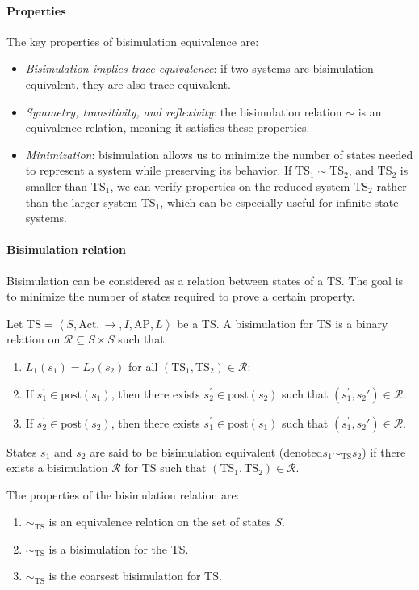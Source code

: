\paragraph*{Properties}
The key properties of bisimulation equivalence are: 
\begin{itemize}
    \item \textit{Bisimulation implies trace equivalence}: if two systems are bisimulation equivalent, they are also trace equivalent.
    \item \textit{Symmetry, transitivity, and reflexivity}: the bisimulation relation $\sim$ is an equivalence relation, meaning it satisfies these properties.
    \item \textit{Minimization}: bisimulation allows us to minimize the number of states needed to represent a system while preserving its behavior. 
        If $\text{TS}_1\sim\text{TS}_2$, and $\text{TS}_2$ is smaller than $\text{TS}_1$, we can verify properties on the reduced system $\text{TS}_2$ rather than the larger system $\text{TS}_1$, which can be especially useful for infinite-state systems.
\end{itemize}

\paragraph*{Bisimulation relation}
Bisimulation can be considered as a relation between states of a TS. 
The goal is to minimize the number of states required to prove a certain property.
\begin{definition}
    Let $\text{TS}=\left\langle S,\text{Act},\rightarrow,I,\text{AP},L\right\rangle$ be a TS. 
    A bisimulation for $\text{TS}$ is a binary relation on $\mathcal{R}\subseteq S\times S$ such that:
    \begin{enumerate}
        \item $L_1(s_1)=L_2(s_2)$ for all $(\text{TS}_1,\text{TS}_2)\in\mathcal{R}$: 
        \item If $s_1^\prime\in\text{post}(s_1)$, then there exists $s_2^\prime\in\text{post}(s_2)$ such that $(s_1^\prime,s_2\prime)\in\mathcal{R}$. 
        \item If $s_2^\prime\in\text{post}(s_2)$, then there exists $s_1^\prime\in\text{post}(s_1)$ such that $(s_1^\prime,s_2\prime)\in\mathcal{R}$. 
    \end{enumerate}
    States $s_1$ and $s_2$ are said to be bisimulation equivalent (denoted$s_1\sim_{\text{TS}}s_2$) if there exists a bisimulation $\mathcal{R}$ for $\text{TS}$ such that $(\text{TS}_1,\text{TS}_2)\in\mathcal{R}$. 
\end{definition}
\noindent The properties of the bisimulation relation are: 
\begin{enumerate}
    \item $\sim_{\text{TS}}$ is an equivalence relation on the set of states $S$.
    \item $\sim_{\text{TS}}$ is a bisimulation for the TS. 
    \item $\sim_{\text{TS}}$ is the coarsest bisimulation for $\text{TS}$. 
\end{enumerate}

